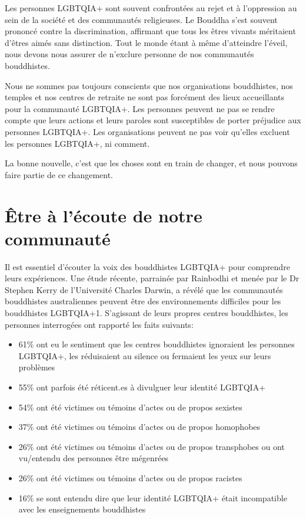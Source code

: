 \documentclass[12pt,openany]{book}
\begin{document}
\noindent Les personnes \mbox{LGBTQIA+} sont souvent confrontées au rejet et à l’oppression au sein de la société et des communautés religieuses. Le Bouddha s’est souvent prononcé contre la discrimination, affirmant que tous les êtres vivants méritaient d’êtres aimés sans distinction.
Tout le monde étant à même d’atteindre l’éveil, nous devons nous assurer de n’exclure personne de nos communautés bouddhistes.

Nous ne sommes pas toujours conscients que nos organisations bouddhistes, nos temples et nos centres de retraite ne sont pas forcément des lieux accueillants pour la communauté \mbox{LGBTQIA+}. Les personnes peuvent ne pas se rendre compte que leurs actions et leurs paroles sont susceptibles de porter préjudice aux personnes \mbox{LGBTQIA+}. Les organisations peuvent ne pas voir qu’elles excluent les personnes \mbox{LGBTQIA+}, ni comment.

La bonne nouvelle, c’est que les choses sont en train de changer, et nous pouvons faire partie de ce changement.

\section*{Être à l’écoute de notre communauté}

\noindent Il est essentiel d’écouter la voix des bouddhistes \mbox{LGBTQIA+} pour comprendre leurs expériences. Une étude récente, parrainée par Rainbodhi et menée par le Dr Stephen Kerry de l’Université Charles Darwin, a révélé que les communautés bouddhistes australiennes peuvent être des environnements difficiles pour les bouddhistes \mbox{LGBTQIA+}1. S’agissant de leurs propres centres bouddhistes, les personnes interrogées ont rapporté les faits suivants:

\begin{itemize}[label=\textbullet, leftmargin=*]
\setlength\itemsep{-0.3em}
  \item 61\% ont eu le sentiment que les centres bouddhistes ignoraient les personnes \mbox{LGBTQIA+}, les réduisaient au silence ou fermaient les yeux sur leurs problèmes
  \item 55\% ont parfois été réticent.es à divulguer leur identité \mbox{LGBTQIA+}
  \item 54\% ont été victimes ou témoins d’actes ou de propos sexistes
  \item 37\% ont été victimes ou témoins d’actes ou de propos homophobes
  \item 26\% ont été victimes ou témoins d’actes ou de propos transphobes ou ont vu/entendu des personnes être mégenrées
  \item 26\% ont été victimes ou témoins d’actes ou de propos racistes
  \item 16\% se sont entendu dire que leur identité \mbox{LGBTQIA+} était incompatible avec les enseignements bouddhistes
\end{itemize}
\end{document}
